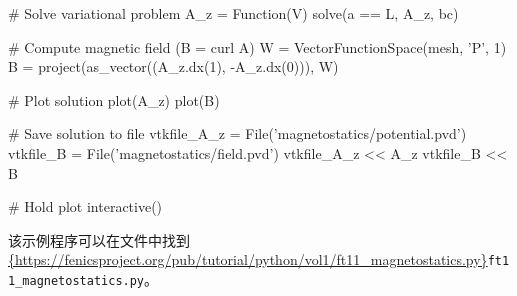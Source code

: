 \begin{python}
# Solve variational problem
A_z = Function(V)
solve(a == L, A_z, bc)

# Compute magnetic field (B = curl A)
W = VectorFunctionSpace(mesh, 'P', 1)
B = project(as_vector((A_z.dx(1), -A_z.dx(0))), W)

# Plot solution
plot(A_z)
plot(B)

# Save solution to file
vtkfile_A_z = File('magnetostatics/potential.pvd')
vtkfile_B = File('magnetostatics/field.pvd')
vtkfile_A_z << A_z
vtkfile_B << B

# Hold plot
interactive()
\end{python}
该示例程序可以在文件中找到\url{{https://fenicsproject.org/pub/tutorial/python/vol1/ft11_magnetostatics.py}}{\nolinkurl{ft11_magnetostatics.py}}。

